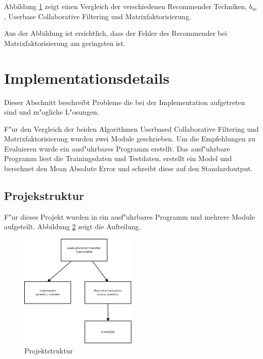 \documentclass[a4paper, 12pt]{article}
\begin{document}
Abbildung \ref{fig:compare} zeigt einen Vergleich der verschiedenen Recommender Techniken, $b_{ui}$, Userbase Collaborative Filtering und Matrixfaktorisierung.

\begin{figure}
\centering
\label{fig:compare}
\caption{}
\end{figure}

Aus der Abbildung ist ersichtlich, dass der Fehler des Recommender bei Matrixfaktorisierung am geringsten ist.

\section{Implementationsdetails}
\label{sec:ram}

Dieser Abschnitt beschreibt Probleme die bei der Implementation aufgetreten sind und m"ogliche L"osungen.

F"ur den Vergleich der beiden Algorithmen Userbased Collaborative Filtering und Matrixfaktorisierung wurden zwei Module geschrieben. Um die Empfehlungen zu Evaluieren wurde ein ausf"uhrbares Programm erstellt. Das ausf"uhrbare Programm liest die Trainingsdaten und Testdaten, erstellt ein Model und berechnet den Mean Absolute Error und schreibt diese auf den Standardoutput.


\subsection{Projekstruktur}
\label{sec:structur}

F"ur dieses Projekt wurden in ein ausf"uhrbares Programm und mehrere Module aufgeteilt. Abbildung \ref{fig:structur} zeigt die Aufteilung.

\begin{figure}
  \centering
      \includegraphics[width=0.5\textwidth]{structur}
  \caption{Projektstruktur}
  \label{fig:structur}
\end{figure}
\end{document}
